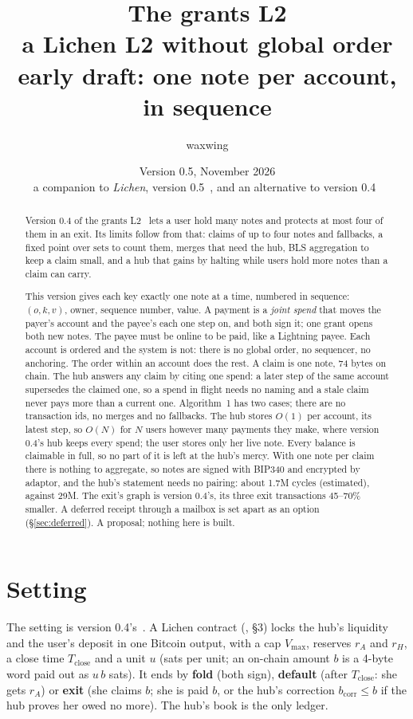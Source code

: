 \documentclass[11pt]{article}
\title{\textbf{The grants L2}\\a Lichen L2 without global order\\[2pt]\large early draft: one note per account, in sequence}
\author{waxwing}
\date{Version 0.5, November 2026\\[2pt]\small a companion to \emph{Lichen}, version 0.5~\cite{lichen}, and an alternative to version 0.4~\cite{grants04}}
\theoremstyle{plain}
\theoremstyle{definition}
\newcommand{\vmax}{V_{\max}}
\newcommand{\Tc}{T_{\mathrm{close}}}
\newcommand{\bcorr}{b_{\mathrm{corr}}}
\begin{document}
\maketitle

\begin{abstract}
Version 0.4 of the grants L2~\cite{grants04} lets a user hold many notes
and protects at most four of them in an exit. Its limits follow from
that: claims of up to four notes and fallbacks, a fixed point over sets
to count them, merges that need the hub, BLS aggregation to keep a claim
small, and a hub that gains by halting while users hold more notes than
a claim can carry.

This version gives each key exactly one note at a time, numbered in
sequence: $(o, k, v)$, owner, sequence number, value. A payment is a
\emph{joint spend} that moves the payer's account and the payee's each
one step on, and both sign it; one grant opens both new notes. The payee
must be online to be paid, like a Lightning payee. Each account is
ordered and the system is not: there is no global order, no sequencer,
no anchoring. The order within an account does the rest. A claim is one
note, 74 bytes on chain. The hub answers any claim by citing one spend:
a later step of the same account supersedes the claimed one, so a
spend in flight needs no naming and a stale claim never pays more than
a current one. Algorithm~1 has two cases; there are no transaction ids,
no merges and no fallbacks. The hub stores $O(1)$ per account, its
latest step, so $O(N)$ for $N$ users however many payments they make,
where version 0.4's hub keeps every spend; the user stores only her
live note. Every balance is claimable in full, so no part of it is left
at the hub's mercy. With one note per
claim there is nothing to aggregate, so notes are signed with BIP340 and
encrypted by adaptor, and the hub's statement needs no pairing: about
1.7M cycles (estimated), against 29M. The exit's graph is version
0.4's, its three exit transactions 45--70\% smaller. A deferred receipt
through a mailbox is set apart as an option (\S\ref{sec:deferred}). A
proposal; nothing here is built.
\end{abstract}

\tableofcontents

\section{Setting}

The setting is version 0.4's~\cite{grants04}. A Lichen contract
(\cite{lichen}, \S3) locks the hub's liquidity and the user's deposit in
one Bitcoin output, with a cap $\vmax$, reserves $r_A$ and $r_H$, a
close time $\Tc$ and a unit $u$ (sats per unit; an on-chain amount $b$
is a 4-byte word paid out as $u\,b$ sats). It ends by \textbf{fold}
(both sign), \textbf{default} (after $\Tc$: she gets $r_A$) or
\textbf{exit} (she claims $b$; she is paid $b$, or the hub's correction
$\bcorr \le b$ if the hub proves her owed no more). The hub's book is the
only ledger.
\end{document}
